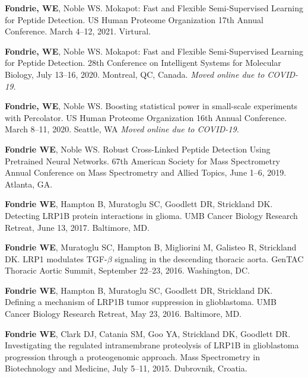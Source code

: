 \documentclass[11pt]{article}
\newcommand{\mysection}[1]{\vspace{1ex \textbf{\large \textrm{#1}} \quad
    \hrulefill}}
\begin{document}
\mysection{Posters}
\begin{etaremune}
  \item \textbf{Fondrie, WE}, Noble WS. Mokapot: Fast and Flexible
  Semi-Supervised Learning for Peptide Detection. US Human Proteome
  Organization 17th Annual Conference. March 4--12, 2021. Virtural.

  \item \textbf{Fondrie, WE}, Noble WS. Mokapot: Fast and Flexible
  Semi-Supervised Learning for Peptide Detection. 28th Conference on
  Intelligent Systems for Molecular Biology, July 13--16, 2020. Montreal, QC,
  Canada. \textit{Moved online due to COVID-19.}
  
  \item \textbf{Fondrie, WE}, Noble WS. Boosting statistical power in
  small-scale experiments with Percolator. US Human Proteome Organization 16th
  Annual Conference. March 8--11, 2020. Seattle, WA \textit{Moved online due to
    COVID-19.}
  
  \item \textbf{Fondrie WE}, Noble WS. Robust Cross-Linked Peptide Detection
  Using Pretrained Neural Networks. 67th American Society for Mass Spectrometry
  Annual Conference on Mass Spectrometry and Allied Topics, June 1--6, 2019.
  Atlanta, GA.

  \item \textbf{Fondrie WE}, Hampton B, Muratoglu SC, Goodlett DR, Strickland
  DK. Detecting LRP1B protein interactions in glioma. UMB Cancer Biology
  Research Retreat, June 13, 2017. Baltimore, MD.

  \item \textbf{Fondrie WE}, Muratoglu SC, Hampton B, Migliorini M, Galisteo R,
  Strickland DK. LRP1 modulates TGF-$\beta$ signaling in the descending
  thoracic aorta. GenTAC Thoracic Aortic Summit, September 22--23, 2016.
  Washington, DC.

  \item \textbf{Fondrie WE}, Hampton B, Muratoglu SC, Goodlett DR, Strickland
  DK. Defining a mechanism of LRP1B tumor suppression in glioblastoma. UMB
  Cancer Biology Research Retreat, May 23, 2016. Baltimore, MD.

  \item \textbf{Fondrie WE}, Clark DJ, Catania SM, Goo YA, Strickland DK,
  Goodlett DR. Investigating the regulated intramembrane proteolysis of LRP1B
  in glioblastoma progression through a proteogenomic approach. Mass
  Spectrometry in Biotechnology and Medicine, July 5--11, 2015. Dubrovnik,
  Croatia.


\end{etaremune}
\end{document}
